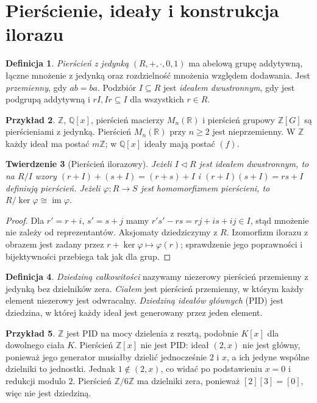 \documentclass[11pt,a4paper,oneside]{report}
\newcommand{\R}{\mathbb{R}}
\newcommand{\Z}{\mathbb{Z}}
\newcommand{\Q}{\mathbb{Q}}
\theoremstyle{plain}
\newtheorem{twierdzenie}{Twierdzenie}[section]
\theoremstyle{definition}
\newtheorem{definicja}[twierdzenie]{Definicja}
\newtheorem{przyklad}[twierdzenie]{Przykład}
\theoremstyle{remark}
\begin{document}
\section{Pierścienie, ideały i konstrukcja ilorazu}
\begin{definicja}
\emph{Pierścień z jedynką} $(R,+,\cdot,0,1)$ ma abelową grupę
addytywną, łączne mnożenie z jedynką oraz rozdzielność mnożenia
względem dodawania. Jest \emph{przemienny}, gdy $ab=ba$.
Podzbiór $I\subseteq R$ jest \emph{ideałem dwustronnym}, gdy
jest podgrupą addytywną i $rI,Ir\subseteq I$ dla wszystkich $r\in R$.
\end{definicja}
\begin{przyklad}
$\Z$, $\Q[x]$, pierścień macierzy $M_n(\R)$ i pierścień grupowy
$\Z[G]$ są pierścieniami z jedynką. Pierścień $M_n(\R)$
przy $n\ge2$ jest nieprzemienny. W $\Z$ każdy ideał ma postać
$m\Z$; w $\Q[x]$ ideały mają postać $(f)$.
\end{przyklad}
\begin{twierdzenie}[Pierścień ilorazowy]
Jeżeli $I\triangleleft R$ jest ideałem dwustronnym, to na $R/I$
wzory $(r+I)+(s+I)=(r+s)+I$ i $(r+I)(s+I)=rs+I$
definiują pierścień. Jeżeli $\varphi:R\to S$ jest homomorfizmem
pierścieni, to $R/\ker\varphi\cong\operatorname{im}\varphi$.
\end{twierdzenie}
\begin{proof}
Dla $r'=r+i$, $s'=s+j$ mamy
$r's'-rs=rj+is+ij\in I$, stąd mnożenie nie zależy
od reprezentantów. Aksjomaty dziedziczymy z $R$.
Izomorfizm ilorazu z obrazem jest zadany przez $r+\ker\varphi
\mapsto\varphi(r)$; sprawdzenie jego poprawności i bijektywności
przebiega tak jak dla grup.
\end{proof}
\begin{definicja}
\emph{Dziedziną całkowitości} nazywamy niezerowy pierścień
przemienny z jedynką bez dzielników zera. \emph{Ciałem} jest
pierścień przemienny, w którym każdy element niezerowy jest
odwracalny. \emph{Dziedziną ideałów głównych} (PID) jest
dziedzina, w której każdy ideał jest generowany przez jeden element.
\end{definicja}
\begin{przyklad}
$\Z$ jest PID na mocy dzielenia z resztą, podobnie $K[x]$
dla dowolnego ciała $K$. Pierścień $\Z[x]$ nie jest PID:
ideał $(2,x)$ nie jest główny, ponieważ jego generator musiałby
dzielić jednocześnie $2$ i $x$, a ich jedyne wspólne dzielniki to jednostki.
Jednak $1\notin(2,x)$, co widać po podstawieniu $x=0$
i redukcji modulo $2$. Pierścień $\Z/6\Z$ ma dzielniki zera,
ponieważ $[2][3]=[0]$, więc nie jest dziedziną.
\end{przyklad}
\end{document}
